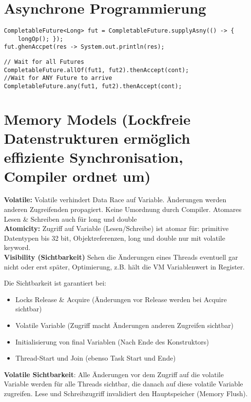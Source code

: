 \section{Asynchrone Programmierung}

\begin{lstlisting}[style=Java]
CompletableFuture<Long> fut = CompletableFuture.supplyAsny(() -> {
	longOp(); });
fut.ghenAccpet(res -> System.out.println(res);
\end{lstlisting}

\begin{lstlisting}[style=Java]
// Wait for all Futures
CompletableFuture.allOf(fut1, fut2).thenAccept(cont);
//Wait for ANY Future to arrive
CompletableFuture.any(fut1, fut2).thenAccept(cont);
\end{lstlisting}


\section{Memory Models (Lockfreie Datenstrukturen ermöglich effiziente Synchronisation, Compiler ordnet um)}
\textbf{Volatile:} Volatile verhindert Data Race auf Variable. Änderungen werden anderen Zugreifenden propagiert. Keine Umordnung durch Compiler. Atomares Lesen \& Schreiben auch für long und double \\
\textbf{Atomicity:} Zugriff auf Variable (Lesen/Schreibe) ist atomar für: primitive Datentypen bis 32 bit, Objektreferenzen, long und double nur mit volatile keyword. \\
\textbf{Visibility (Sichtbarkeit)} Sehen die Änderungen eines Threads eventuell gar nicht oder erst später, Optimierung, z.B. hält die VM Variablenwert in Register.

Die Sichtbarkeit ist garantiert bei:
\begin{itemize}
	\itemsep -0.2em
	\item Locks Release \& Acquire (Änderungen vor Release werden bei Acquire sichtbar)
	\item Volatile Variable (Zugriff macht Änderungen anderen Zugreifen sichtbar)
	\item Initialisierung von final Variablen (Nach Ende des Konstruktors)
	\item Thread-Start und Join (ebenso Task Start und Ende)
\end{itemize}

\textbf{Volatile Sichtbarkeit}: Alle Änderungen vor dem Zugriff auf die volatile Variable werden für alle Threads sichtbar, die danach auf diese volatile Variable zugreifen. Lese und Schreibzugriff invalidiert den Hauptspeicher (Memory Flush).

